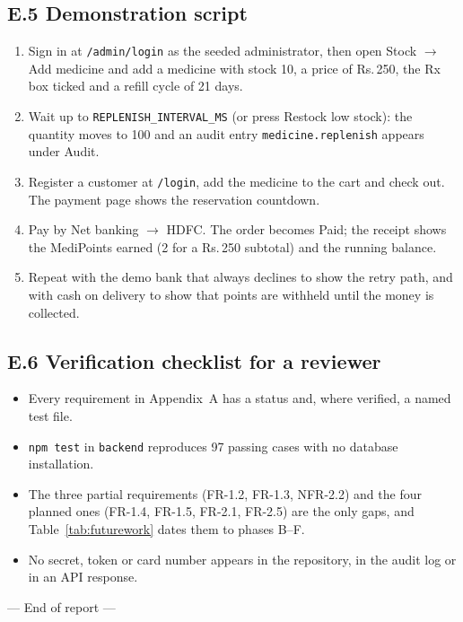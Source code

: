 \documentclass[11pt,a4paper]{article}
\providecommand{\rupee}{Rs.\,}
\begin{document}
\subsection*{E.5 Demonstration script}
\begin{enumerate}[leftmargin=1.6em,itemsep=2pt,topsep=2pt]
  \item Sign in at \texttt{/admin/login} as the seeded administrator, then open Stock $\rightarrow$ Add medicine and add a medicine with stock 10, a price of \rupee250, the Rx box ticked and a refill cycle of 21 days.
  \item Wait up to \texttt{REPLENISH\_INTERVAL\_MS} (or press Restock low stock): the quantity moves to 100 and an audit entry \texttt{medicine.replenish} appears under Audit.
  \item Register a customer at \texttt{/login}, add the medicine to the cart and check out. The payment page shows the reservation countdown.
  \item Pay by Net banking $\rightarrow$ HDFC. The order becomes Paid; the receipt shows the MediPoints earned (2 for a \rupee250 subtotal) and the running balance.
  \item Repeat with the demo bank that always declines to show the retry path, and with cash on delivery to show that points are withheld until the money is collected.
\end{enumerate}

\subsection*{E.6 Verification checklist for a reviewer}
\begin{itemize}[leftmargin=1.2em,itemsep=1pt,topsep=2pt]
  \item Every requirement in Appendix~A has a status and, where verified, a named test file.
  \item \texttt{npm test} in \texttt{backend} reproduces 97 passing cases with no database installation.
  \item The three partial requirements (FR-1.2, FR-1.3, NFR-2.2) and the four planned ones (FR-1.4, FR-1.5, FR-2.1, FR-2.5) are the only gaps, and Table~\ref{tab:futurework} dates them to phases B--F.
  \item No secret, token or card number appears in the repository, in the audit log or in an API response.
\end{itemize}

\vspace{1.2cm}
\begin{center}
--- End of report ---
\end{center}
\end{document}
